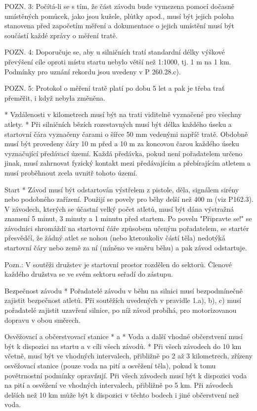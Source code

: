 POZN. 3: Počítá-li se s tím, že část závodu bude vymezena pomocí dočasně umístěných pomůcek, jako jsou kužele, plůtky apod., musí být jejich poloha stanovena před započetím měření a dokumentace o jejich umístění musí být součástí každé zprávy o měření tratě.

POZN. 4: Doporučuje se, aby u silničních tratí standardní délky výškové převýšení cíle oproti místu startu nebylo větší než 1:1000, tj. 1 m na 1 km. Podmínky pro uznání rekordu jsou uvedeny v P 260.28.c).

POZN. 5: Protokol o měření tratě platí po dobu 5 let a pak je třeba trať přeměřit, i když nebyla změněna.

* Vzdálenosti v kilometrech musí být na trati viditelně vyznačené pro všechny atlety.
* Při silničních bězích rozestavných musí být délka každého úseku a startovní čára vyznačeny čarami o šířce 50 mm vedenými napříč tratě. Obdobně musí být provedeny čáry 10 m před a 10 m za koncovou čarou každého úseku vyznačující předávací území. Každá předávka, pokud není pořadatelem určeno jinak, musí zahrnovat fyzický kontakt mezi předávajícím a přebírajícím atletem a musí proběhnout zcela uvnitř tohoto území.

Start
* Závod musí být odstartován výstřelem z pistole, děla, signálem sirény nebo podobného zařízení. Použijí se povely pro běhy delší než 400 m (viz P162.3). V závodech, kterých se účastní velký počet atletů, musí být dána výstražná znamení 5 minut, 3 minuty a 1 minutu před startem.  Po povelu "Připravte se!" se závodníci shromáždí na startovní čáře způsobem učeným pořadatelem, se startér přesvědčí, že žádný atlet se nohou (nebo kteroukoliv částí těla) nedotýká startovní čáry nebo země za ní (míněno ve směru běhu) a pak závod odstartuje.

Pozn.: V soutěži družstev je startovní prostor rozdělen do sektorů. Členové každého družstva se ve svém sektoru seřadí do zástupu.

Bezpečnost závodu
* Pořadatelé závodu v běhu na silnici musí bezpodmínečně zajistit bezpečnost atletů. Při soutěžích uvedených v pravidle 1.a), b), c) musí pořadatelé zajistit uzavření silnice, po níž závod probíhá, pro motorizovanou dopravu v obou směrech.

Osvěžovací a občerstvovací stanice
* \begitems \style a
  * Voda a další vhodné občerstvení musí být k dispozici na startu a v cíli všech závodů.
  * Při všech závodech do 10 km včetně, musí být ve vhodných intervalech, přibližně po 2 až 3 kilometrech, zřízeny osvěžovací stanice (pouze voda na pití a osvěžení těla), pokud k tomu povětrnostní podmínky opravňují. Při všech závodech musí být k dispozici voda na pití a osvěžení ve vhodných intervalech, přibližně po 5 km. Při závodech delších než 10 km může být k dispozici v těchto bodech i jiné občerstvení než voda.

